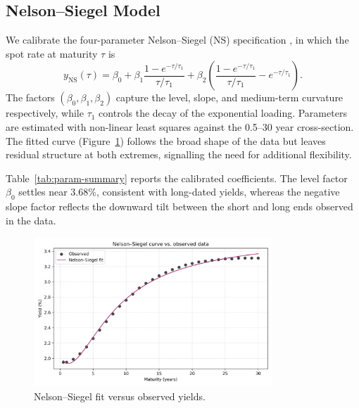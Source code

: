 \documentclass[12pt]{article}
\begin{document}
\subsection{Nelson--Siegel Model}
\begin{spacing}{1.15}
We calibrate the four-parameter Nelson--Siegel (NS) specification \parencite{nelson_siegel_1987}, in which the spot rate at maturity $\tau$ is
\begin{equation}
  y_{\text{NS}}(\tau) = \beta_0 + \beta_1 \frac{1 - e^{-\tau/\tau_1}}{\tau/\tau_1} + \beta_2 \left( \frac{1 - e^{-\tau/\tau_1}}{\tau/\tau_1} - e^{-\tau/\tau_1} \right).
\end{equation}
The factors $(\beta_0, \beta_1, \beta_2)$ capture the level, slope, and medium-term curvature respectively, while $\tau_1$ controls the decay of the exponential loading. Parameters are estimated with non-linear least squares against the 0.5--30 year cross-section. The fitted curve (Figure~\ref{fig:ns-fit}) follows the broad shape of the data but leaves residual structure at both extremes, signalling the need for additional flexibility.

Table~\ref{tab:param-summary} reports the calibrated coefficients. The level factor $\beta_0$ settles near 3.68\%, consistent with long-dated yields, whereas the negative slope factor reflects the downward tilt between the short and long ends observed in the data.
\end{spacing}

\begin{figure}[htbp]
  \centering
  \includegraphics[width=0.8\textwidth]{../data/output/figure_ns_fit.png}
  \caption{Nelson--Siegel fit versus observed yields.}
  \label{fig:ns-fit}
\end{figure}

\FloatBarrier
\end{document}
